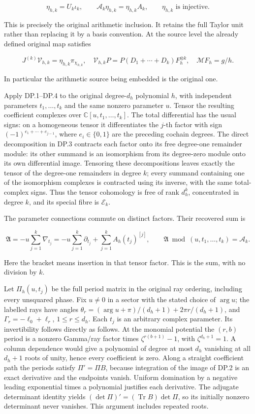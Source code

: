 \[
\eta_{h,k}=U_k\iota_k,
\qquad \mathcal A_k\eta_{h,k}=\eta_{h,k}A_k,
\qquad \eta_{h,k}\text{ is injective}.
\tag{DP.26}
\]

This is precisely the original arithmetic inclusion. It retains the full Taylor unit rather than replacing it by a basis convention. At the source level the already defined original map satisfies

\[
J^{(k)}\mathcal V_{h,k}=\eta_{h,k}\pi_{\chi_{h,k}},
\quad \mathcal V_{h,k}P=P(D_1+\cdots+D_k)F_h^{\otimes k},
\quad \mathcal M F_h=g/h.
\tag{DP.27}
\]

In particular the arithmetic source being embedded is the original one.

Apply DP.1--DP.4 to the original degree-\(d_h\) polynomial \(h\), with independent parameters \(t_1,\ldots,t_k\) and the same nonzero parameter \(u\). Tensor the resulting coefficient complexes over \(\mathbb C[u,t_1,\ldots,t_k]\). The total differential has the usual signs: on a homogeneous tensor it differentiates the \(j\)-th factor with sign \((-1)^{e_1+\cdots+e_{j-1}}\), where \(e_i\in\{0,1\}\) are the preceding cochain degrees. The direct decomposition in DP.3 contracts each factor onto its free degree-one remainder module: its other summand is an isomorphism from its degree-zero module onto its own differential image. Tensoring these decompositions leaves exactly the tensor of the degree-one remainders in degree \(k\); every summand containing one of the isomorphism complexes is contracted using its inverse, with the same total-complex signs. Thus the tensor cohomology is free of rank \(d_h^k\), concentrated in degree \(k\), and its special fibre is \(\mathcal E_k\).

The parameter connections commute on distinct factors. Their recovered sum is

\[
\mathfrak A=-u\sum_{j=1}^k\nabla_{t_j}
=-u\sum_{j=1}^k\partial_{t_j}
 +\sum_{j=1}^k A_h(t_j)^{[j]},
\qquad
\mathfrak A\bmod(u,t_1,\ldots,t_k)=\mathcal A_k.
\tag{DP.28}
\]

Here the bracket means insertion in that tensor factor. This is the sum, with no division by \(k\).

Let \(\Pi_h(u,t_j)\) be the full period matrix in the original ray ordering, including every unsquared phase. Fix \(u\ne0\) in a sector with the stated choice of \(\arg u\); the labelled rays have angles \(\theta_r=(\arg u+\pi)/(d_h+1)+2\pi r/(d_h+1)\), and \(\Gamma_r=-\ell_0+\ell_r\), \(1\le r\le d_h\). Each \(t_j\) is an arbitrary complex parameter. Its invertibility follows directly as follows. At the monomial potential the \((r,b)\) period is a nonzero Gamma/ray factor times \(\zeta^{r(b+1)}-1\), with \(\zeta^{d_h+1}=1\). A column dependence would give a polynomial of degree at most \(d_h\) vanishing at all \(d_h+1\) roots of unity, hence every coefficient is zero. Along a straight coefficient path the periods satisfy \(\Pi'=\Pi B\), because integration of the image of DP.2 is an exact derivative and the endpoints vanish. Uniform domination by a negative leading exponential times a polynomial justifies each derivative. The adjugate determinant identity yields \((\det\Pi)'=(\operatorname{Tr}B)\det\Pi\), so its initially nonzero determinant never vanishes. This argument includes repeated roots.

